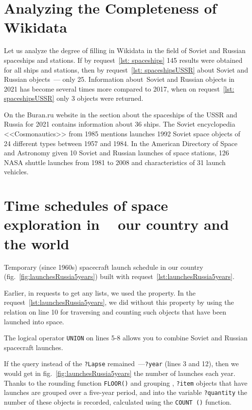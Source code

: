 \section{Analyzing the Completeness of Wikidata}

Let us analyze the degree of filling in Wikidata in the field of Soviet and Russian spaceships and stations.
If by request~\ref{lst: spaceships} 145 results were obtained for all ships and stations,
then by request~\ref{lst: spaceshipsUSSR} about Soviet and Russian objects~--- only 25.
Information about~Soviet and Russian objects in 2021
has become several times more compared to 2017,
when on request~\ref{lst: spaceshipsUSSR} only 3 objects were returned.

On the Buran.ru website in the section about the spaceships of the USSR and Russia for 2021
contains information about 36\autocite{spacecraftBuran} ships.
The Soviet encyclopedia <<Cosmonautics>> from 1985 mentions launches
1992 Soviet space objects of 24 different types
between 1957 and 1984.\autocite[498]{spacecraftCosmonavtika}
In the American Directory of Space and Astronomy
given 10 Soviet and Russian launches of space stations\autocite[296]{spacecraftSAA},
126 NASA shuttle launches from 1981 to 2008\autocite[288]{spacecraftSAA}
and characteristics of 31 launch vehicles\autocite[290-291]{spacecraftSAA}.

\section{Time schedules of space exploration in ~ our country and the world}

Temporary (since 1960s)
spacecraft launch schedule in our country (fig.~\ref{fig:launchesRussia5years})
built with request~\ref{lst:launchesRussia5years}.%

Earlier, in requests to get any lists, we used the property.
In the request~\ref{lst:launchesRussia5years}, we did without this property by using the relation
 on line 10
for traversing and counting such objects that have been launched into space.

The logical operator \lstinline|UNION| on lines 5-8
allows you to combine Soviet and Russian spacecraft launches.

If the query instead of the \lstinline|?Lapse| remained~---\lstinline|?year| (lines 3 and 12),
then we would get in fig.~\ref{fig:launchesRussia5years}
the number of launches each year.
Thanks to the rounding function \lstinline|FLOOR()|
and grouping%
,
\lstinline|?item| objects that have launches are grouped over a five-year period,
and into the variable \lstinline|?quantity| the number of these objects is recorded,
calculated using the \lstinline|COUNT ()| function.

